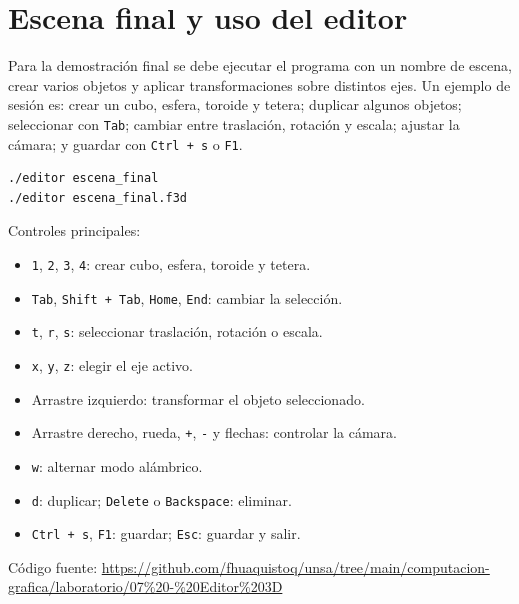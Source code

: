 \documentclass[a4paper,12pt]{article}
\begin{document}
\section{Escena final y uso del editor}

Para la demostración final se debe ejecutar el programa con un nombre de escena, crear varios objetos y aplicar transformaciones sobre distintos ejes. Un ejemplo de sesión es: crear un cubo, esfera, toroide y tetera; duplicar algunos objetos; seleccionar con \texttt{Tab}; cambiar entre traslación, rotación y escala; ajustar la cámara; y guardar con \texttt{Ctrl + s} o \texttt{F1}.


\begin{lstlisting}
./editor escena_final
./editor escena_final.f3d
\end{lstlisting}

Controles principales:

\begin{itemize}[leftmargin=*]
    \item \texttt{1}, \texttt{2}, \texttt{3}, \texttt{4}: crear cubo, esfera, toroide y tetera.
    \item \texttt{Tab}, \texttt{Shift + Tab}, \texttt{Home}, \texttt{End}: cambiar la selección.
    \item \texttt{t}, \texttt{r}, \texttt{s}: seleccionar traslación, rotación o escala.
    \item \texttt{x}, \texttt{y}, \texttt{z}: elegir el eje activo.
    \item Arrastre izquierdo: transformar el objeto seleccionado.
    \item Arrastre derecho, rueda, \texttt{+}, \texttt{-} y flechas: controlar la cámara.
    \item \texttt{w}: alternar modo alámbrico.
    \item \texttt{d}: duplicar; \texttt{Delete} o \texttt{Backspace}: eliminar.
    \item \texttt{Ctrl + s}, \texttt{F1}: guardar; \texttt{Esc}: guardar y salir.
\end{itemize}

\newpage

Código fuente: \url{https://github.com/fhuaquistoq/unsa/tree/main/computacion-grafica/laboratorio/07%20-%20Editor%203D}

\end{document}
